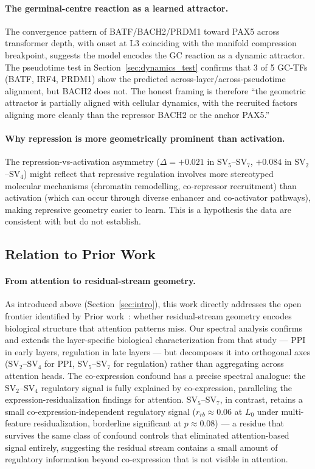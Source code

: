 \documentclass[12pt]{article}
\newcommand{\SV}[1]{\mathrm{SV}_{#1}}
\begin{document}
\paragraph{The germinal-centre reaction as a learned attractor.}
The convergence pattern of BATF/BACH2/PRDM1 toward PAX5 across transformer depth, with onset at L3 coinciding with the manifold compression breakpoint, suggests the model encodes the GC reaction as a dynamic attractor. The pseudotime test in Section~\ref{sec:dynamics_test} confirms that 3 of 5 GC-TFs (BATF, IRF4, PRDM1) show the predicted across-layer/across-pseudotime alignment, but BACH2 does not. The honest framing is therefore ``the geometric attractor is partially aligned with cellular dynamics, with the recruited factors aligning more cleanly than the repressor BACH2 or the anchor PAX5.''

\paragraph{Why repression is more geometrically prominent than activation.}
The repression-vs-activation asymmetry ($\Delta = +0.021$ in $\SV{5}$--$\SV{7}$, $+0.084$ in $\SV{2}$--$\SV{4}$) might reflect that repressive regulation involves more stereotyped molecular mechanisms (chromatin remodelling, co-repressor recruitment) than activation (which can occur through diverse enhancer and co-activator pathways), making repressive geometry easier to learn. This is a hypothesis the data are consistent with but do not establish.

\subsection{Relation to Prior Work}

\paragraph{From attention to residual-stream geometry.}
As introduced above (Section~\ref{sec:intro}), this work directly addresses the open frontier identified by Prior work~\cite{kendiukhov2026attention}: whether residual-stream geometry encodes biological structure that attention patterns miss.
Our spectral analysis confirms and extends the layer-specific biological characterization from that study --- PPI in early layers, regulation in late layers --- but decomposes it into orthogonal axes ($\SV{2}$--$\SV{4}$ for PPI, $\SV{5}$--$\SV{7}$ for regulation) rather than aggregating across attention heads.
The co-expression confound has a precise spectral analogue: the $\SV{2}$--$\SV{4}$ regulatory signal is fully explained by co-expression, paralleling the expression-residualization findings for attention.
$\SV{5}$--$\SV{7}$, in contrast, retains a small co-expression-independent regulatory signal ($r_{rb} \approx 0.06$ at $L_0$ under multi-feature residualization, borderline significant at $p \approx 0.08$) --- a residue that survives the same class of confound controls that eliminated attention-based signal entirely, suggesting the residual stream contains a small amount of regulatory information beyond co-expression that is not visible in attention.
\end{document}

